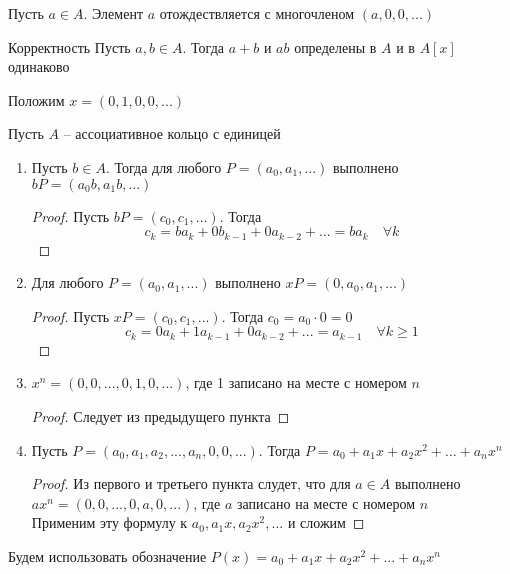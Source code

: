\begin{notation}
	Пусть $a \in A$. Элемент $a$ отождествляется с многочленом $(a, 0, 0, ...) $
\end{notation}

\begin{undefthm}{Корректность}
	Пусть $a, b \in A$. Тогда $a + b$ и $ab$ определены в $A$ и в $A[x]$ одинаково
\end{undefthm}

\begin{notation}
	Положим $x = (0, 1, 0, 0, ...) $
\end{notation}

\begin{properties}
	Пусть $A$ -- ассоциативное кольцо с единицей
	\begin{enumerate}
		\item Пусть $b \in A$. Тогда для любого $P = (a_0, a_1, ...)$ выполнено $ bP = (a_0b, a_1b, ...) $
		\begin{proof}
			Пусть $bP = (c_0, c_1, ...) $. Тогда
			$$ c_k = ba_k + 0b_{k - 1} + 0a_{k - 2} + ... = ba_k \quad \forall k $$
		\end{proof}
		\item Для любого $P = (a_0, a_1, ...)$ выполнено $ xP = (0, a_0, a_1, ...) $
		\begin{proof}
			Пусть $xP = (c_0, c_1, ...)$. Тогда $c_0 = a_0 \cdot 0 = 0 $
			$$ c_k = 0a_k + 1a_{k - 1} + 0a_{k - 2} + ... = a_{k - 1} \quad \forall k \ge 1 $$
		\end{proof}
		\item $x^n = (0, 0, ..., 0, 1, 0, ...)$, где 1 записано на месте с номером $n$
		\begin{proof}
			Следует из предыдущего пункта
		\end{proof}
		\item Пусть $P = (a_0, a_1, a_2, ..., a_n, 0, 0, ...)$. Тогда $ P = a_0 + a_1x + a_2 x^2 + ... + a_nx^n $
		\begin{proof}
			Из первого и третьего пункта слудет, что для $a \in A$ выполнено $ax^n = (0, 0, ..., 0, a, 0, ...)$, где $a$ записано на месте с номером $n$ \\
			Применим эту формулу к $a_0, a_1x, a_2x^2, ...$ и сложим
		\end{proof}
	\end{enumerate}
\end{properties}

\begin{notation}
	Будем использовать обозначение $P(x) = a_0 + a_1x + a_2x^2 + ... + a_nx^n $
\end{notation}

